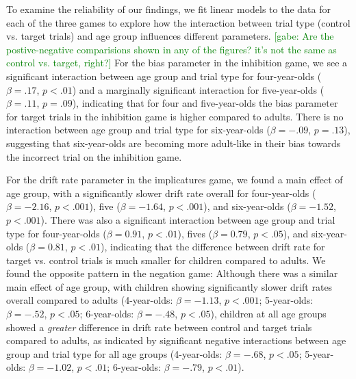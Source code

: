 \documentclass[10pt,letterpaper]{article}
\newcommand{\gabe}[1]{\textcolor{Green}{[gabe: #1]}}
\begin{document}
To examine the reliability of our findings, we fit linear models to the data for each of the three games to explore how the interaction between trial type (control vs. target trials) and age group influences different parameters. \gabe{Are the postive-negative comparisions shown in any of the figures? it's not the same as control vs. target, right?} For the bias parameter in the inhibition game, we see a significant interaction between age group and trial type for four-year-olds ($\beta = .17$, $p< .01$) and a marginally significant interaction for five-year-olds ($\beta = .11$, $p = .09$), indicating that for four and five-year-olds the bias parameter for target trials in the inhibition game is higher compared to adults.  There is no interaction between age group and trial type for six-year-olds ($\beta = -.09$, $p = .13$), suggesting that six-year-olds are becoming more adult-like in their bias towards the incorrect trial on the inhibition game.

For the drift rate parameter in the implicatures game, we found a main effect of age group, with a significantly slower drift rate overall for four-year-olds ($\beta = -2.16$, $p < .001$), five ($\beta = -1.64$, $p < .001$), and six-year-olds ($\beta = -1.52$, $p < .001$).  There was also a significant interaction between age group and trial type for four-year-olds ($\beta = 0.91$, $p <.01$), fives ($\beta = 0.79$, $p <.05$), and six-year-olds ($\beta = 0.81$, $p <.01$), indicating that the difference between drift rate for target vs. control trials is much smaller for children compared to adults.  We found the opposite pattern in the negation game: Although there was a similar main effect of age group, with children showing significantly slower drift rates overall compared to adults (4-year-olds: $\beta = -1.13$, $p <.001$; 5-year-olds: $\beta = -.52$, $p <.05$; 6-year-olds: $\beta = -.48$, $p <.05$), children at all age groups showed a \emph{greater} difference in drift rate between control and target trials compared to adults, as indicated by significant negative interactions between age group and trial type for all age groups (4-year-olds: $\beta = -.68$, $p <.05$; 5-year-olds: $\beta = -1.02$, $p <.01$; 6-year-olds: $\beta = -.79$, $p <.01$).  
\end{document}
